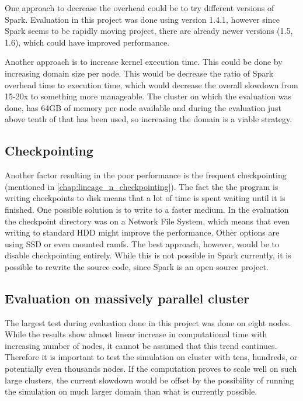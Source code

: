 \documentclass{l4proj}
\begin{document}
One approach to decrease the overhead could be to try different versions of Spark.
Evaluation in this project was done using version 1.4.1, however since Spark 
seems to be rapidly moving project, there are already newer versions (1.5, 1.6), 
which could have improved performance.

Another approach is to increase kernel execution time. This could be done by increasing
domain size per node. This would be decrease the ratio of Spark overhead time to 
execution time, which would decrease the overall slowdown from 15-20x to 
something more manageable. The cluster on which the evaluation was done, has 64GB
of memory per node available and during the evaluation just above tenth of that
has been used, so increasing the domain is a viable strategy.

\subsection{Checkpointing}

Another factor resulting in the poor performance is the frequent checkpointing
(mentioned in \autoref{chap:lineage_n_checkpointing}). The fact the the program
is writing checkpoints to disk means that a lot of time is spent waiting until
it is finished. One possible solution is to write to a faster medium. In the evaluation
the checkpoint directory was on a Network File System, which means that even 
writing to standard HDD might improve the performance. Other options are using SSD
or even mounted ramfs. The best approach, however, would be to disable checkpointing
entirely. While this is not possible in Spark currently, it is possible to rewrite 
the source code, since Spark is an open source project.

\subsection{Evaluation on massively parallel cluster}

The largest test during evaluation done in this project was done on eight nodes.
While the results show almost linear increase in computational time with
increasing number of nodes, it cannot be assumed that this trend continues.
Therefore it is important to test the simulation on cluster with tens, hundreds,
or potentially even thousands nodes. If the computation proves to scale well
on such large clusters, the current slowdown would be offset by the 
possibility of running the simulation on much larger domain than what is
currently possible.
\end{document}
